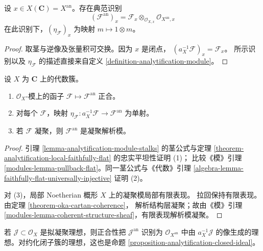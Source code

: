 \begin{lemma}
\label{lemma-analytification-module-stalks}
设 $x\in X(\mathbf C)=X^{\mathrm{an}}$。存在典范识别
$$
(\mathcal F^{\mathrm{an}})_x
=\mathcal F_x\otimes_{\mathcal O_{X,x}}
\mathcal O_{X^{\mathrm{an}},x}
$$
在此识别下，$(\eta_{\mathcal F})_x$ 为映射 $m\mapsto1\otimes m$。
\end{lemma}

\begin{proof}
取茎与逆像及张量积可交换。因为 $x$ 是闭点，
$(a_X^{-1}\mathcal F)_x=\mathcal F_x$。
所示识别以及 $\eta_{\mathcal F}$ 的描述直接来自定义
\ref{definition-analytification-module}。
\end{proof}

\begin{lemma}
\label{lemma-analytification-exact-faithful-coherent}
\begin{reference}
\cite[\S 3，第 9 号，命题 10]{GAGA}
\end{reference}
设 $X$ 为 $\mathbf C$ 上的代数簇。
\begin{enumerate}
\item $\mathcal O_X$-模上的函子 $\mathcal F\mapsto\mathcal F^{\mathrm{an}}$ 正合。
\item 对每个 $\mathcal F$，映射
$\eta_{\mathcal F}:a_X^{-1}\mathcal F\to\mathcal F^{\mathrm{an}}$ 为单射。
\item 若 $\mathcal F$ 凝聚，则 $\mathcal F^{\mathrm{an}}$ 是凝聚解析模。
\end{enumerate}
\end{lemma}

\begin{proof}
引理 \ref{lemma-analytification-module-stalks} 的茎公式与定理
\ref{theorem-analytification-local-faithfully-flat} 的忠实平坦性证明 (1)；
比较《模》引理 \ref{modules-lemma-pullback-flat}。同一茎公式与《代数》引理
\ref{algebra-lemma-faithfully-flat-universally-injective} 证明 (2)。

对 (3)，局部 Noetherian 概形 $X$ 上的凝聚模局部有限表现。
拉回保持有限表现。由定理 \ref{theorem-oka-cartan-coherence}，
解析结构层凝聚；故由《模》引理
\ref{modules-lemma-coherent-structure-sheaf}，有限表现解析模凝聚。
\end{proof}

\begin{remark}[理想的解析化]
\label{remark-analytification-ideal-sheaf}
若 $\mathcal J\subset\mathcal O_X$ 是拟凝聚理想，则正合性把
$\mathcal J^{\mathrm{an}}$ 识别为 $\mathcal O_{X^{\mathrm{an}}}$ 中由
$a_X^{-1}\mathcal J$ 的像生成的理想。对约化闭子簇的理想，这也是命题
\ref{proposition-analytification-closed-ideal}。
\end{remark}


